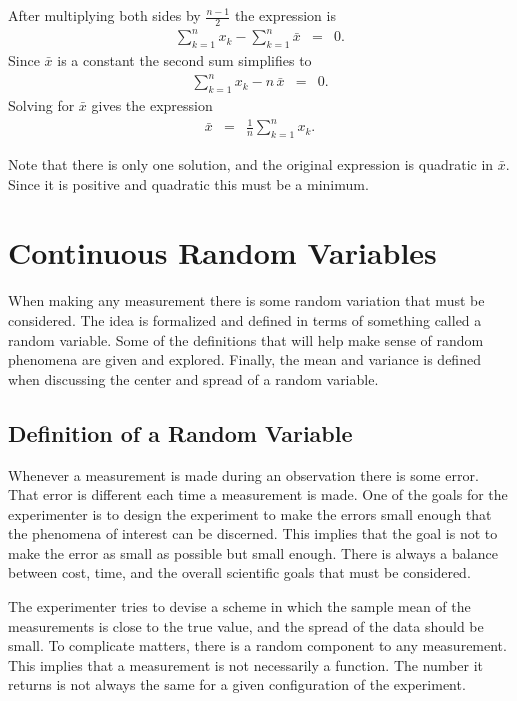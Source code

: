 \documentclass[12pt]{article}
\begin{document}
After multiplying both sides by $\frac{n-1}{2}$ the expression is
\begin{eqnarray*}
  \sum^n_{k=1}  x_k - \sum^n_{k=1} \bar{x} & = & 0.
\end{eqnarray*}
Since $\bar{x}$ is a constant the second sum simplifies to
\begin{eqnarray*}
  \sum^n_{k=1}  x_k - n \, \bar{x} & = & 0.
\end{eqnarray*}
Solving for $\bar{x}$ gives the expression
\begin{eqnarray*}
  \bar{x} & = & \frac{1}{n} \sum^n_{k=1}  x_k.
\end{eqnarray*}

Note that there is only one solution, and the original expression is
quadratic in $\bar{x}$. Since it is positive and quadratic this must
be a minimum.

\fi

\section{Continuous Random Variables}

When making any measurement there is some random variation that must
be considered.  The idea is formalized and defined in terms of
something called a random variable. Some of the definitions that will
help make sense of random phenomena are given and explored. Finally,
the mean and variance is defined when discussing the center and spread
of a random variable.

\subsection{Definition of a Random Variable}

Whenever a measurement is made during an observation there is some
error. That error is different each time a measurement is made. One of
the goals for the experimenter is to design the experiment to make the
errors small enough that the phenomena of interest can be discerned.
This implies that the goal is not to make the error as small as
possible but small enough. There is always a balance between cost,
time, and the overall scientific goals that must be considered.

The experimenter tries to devise a scheme in which the sample mean of
the measurements is close to the true value, and the spread of the
data should be small. To complicate matters, there is a random
component to any measurement. This implies that a measurement is not
necessarily a function. The number it returns is not always the same
for a given configuration of the experiment.
\end{document}

